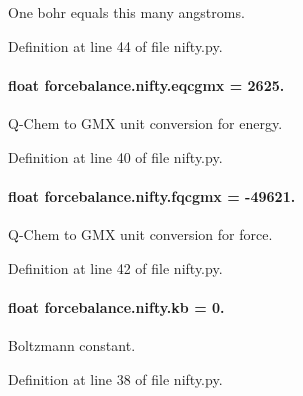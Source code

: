 One bohr equals this many angstroms. 



Definition at line 44 of file nifty.\-py.

\hypertarget{namespaceforcebalance_1_1nifty_a7cec4d46378b888cd867de05d0168d96}{
\paragraph[{eqcgmx}]{\setlength{\rightskip}{0pt plus 5cm}float forcebalance.\-nifty.\-eqcgmx = 2625.}}\label{namespaceforcebalance_1_1nifty_a7cec4d46378b888cd867de05d0168d96}


Q-\/\-Chem to G\-M\-X unit conversion for energy. 



Definition at line 40 of file nifty.\-py.

\hypertarget{namespaceforcebalance_1_1nifty_ab1ec21beaae0d8328e7e4c3b89d972ab}{
\paragraph[{fqcgmx}]{\setlength{\rightskip}{0pt plus 5cm}float forcebalance.\-nifty.\-fqcgmx = -\/49621.}}\label{namespaceforcebalance_1_1nifty_ab1ec21beaae0d8328e7e4c3b89d972ab}


Q-\/\-Chem to G\-M\-X unit conversion for force. 



Definition at line 42 of file nifty.\-py.

\hypertarget{namespaceforcebalance_1_1nifty_ae0916a3186f4f8b238a0d58bb9f6a3da}{
\paragraph[{kb}]{\setlength{\rightskip}{0pt plus 5cm}float forcebalance.\-nifty.\-kb = 0.}}\label{namespaceforcebalance_1_1nifty_ae0916a3186f4f8b238a0d58bb9f6a3da}


Boltzmann constant. 



Definition at line 38 of file nifty.\-py.

